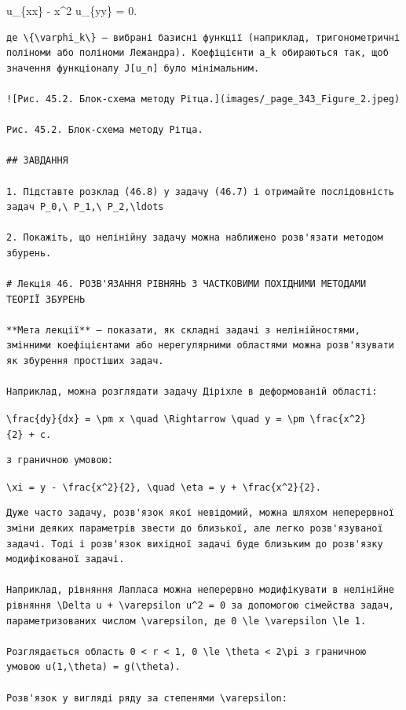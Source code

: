 \documentclass[
  ukrainian,
]{article}
\begin{document}
u\_\{xx\} - x\^{}2 u\_\{yy\} = 0.

\begin{verbatim}
де \{\varphi_k\} — вибрані базисні функції (наприклад, тригонометричні поліноми або поліноми Лежандра). Коефіцієнти a_k обираються так, щоб значення функціоналу J[u_n] було мінімальним.

![Рис. 45.2. Блок-схема методу Рітца.](images/_page_343_Figure_2.jpeg)

Рис. 45.2. Блок-схема методу Рітца.

## ЗАВДАННЯ

1. Підставте розклад (46.8) у задачу (46.7) і отримайте послідовність задач P_0,\ P_1,\ P_2,\ldots

2. Покажіть, що нелінійну задачу можна наближено розв'язати методом збурень.

# Лекція 46. РОЗВ'ЯЗАННЯ РІВНЯНЬ З ЧАСТКОВИМИ ПОХІДНИМИ МЕТОДАМИ ТЕОРІЇ ЗБУРЕНЬ

**Мета лекції** — показати, як складні задачі з нелінійностями, змінними коефіцієнтами або нерегулярними областями можна розв'язувати як збурення простіших задач.

Наприклад, можна розглядати задачу Діріхле в деформованій області:
\end{verbatim}

\texttt{\textbackslash{}frac\{dy\}\{dx\}\ =\ \textbackslash{}pm\ x\ \textbackslash{}quad\ \textbackslash{}Rightarrow\ \textbackslash{}quad\ y\ =\ \textbackslash{}pm\ \textbackslash{}frac\{x\^{}2\}\{2\}\ +\ c.}

\begin{verbatim}
з граничною умовою:
\end{verbatim}

\texttt{\textbackslash{}xi\ =\ y\ -\ \textbackslash{}frac\{x\^{}2\}\{2\},\ \textbackslash{}quad\ \textbackslash{}eta\ =\ y\ +\ \textbackslash{}frac\{x\^{}2\}\{2\}.}

\begin{verbatim}
Дуже часто задачу, розв'язок якої невідомий, можна шляхом неперервної зміни деяких параметрів звести до близької, але легко розв'язуваної задачі. Тоді і розв'язок вихідної задачі буде близьким до розв'язку модифікованої задачі.

Наприклад, рівняння Лапласа можна неперервно модифікувати в нелінійне рівняння \Delta u + \varepsilon u^2 = 0 за допомогою сімейства задач, параметризованих числом \varepsilon, де 0 \le \varepsilon \le 1.

Розглядається область 0 < r < 1, 0 \le \theta < 2\pi з граничною умовою u(1,\theta) = g(\theta).

Розв'язок у вигляді ряду за степенями \varepsilon:
\end{verbatim}
\end{document}
